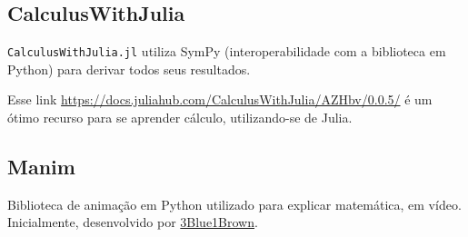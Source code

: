 \documentclass[12pt]{article}
\begin{document}
\subsection{CalculusWithJulia}
\label{sec:orgde7a408}
\texttt{CalculusWithJulia.jl} utiliza SymPy (interoperabilidade com a
biblioteca em Python) para derivar todos seus resultados.

Esse link \url{https://docs.juliahub.com/CalculusWithJulia/AZHbv/0.0.5/} é
um ótimo recurso para se aprender cálculo, utilizando-se de Julia.
\subsection{Manim}
\label{sec:org98080a5}
Biblioteca de animação em Python utilizado para explicar matemática,
em vídeo. Inicialmente, desenvolvido por \href{https://www.youtube.com/c/3blue1brown}{3Blue1Brown}.
\end{document}
